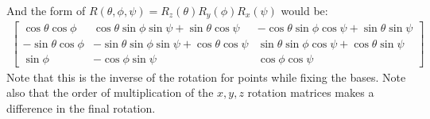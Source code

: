 And the form of $R(\theta,\phi,\psi) = R_z(\theta)R_y(\phi)R_x(\psi)$ would be:
\begin{align}
\begin{bmatrix}
\cos\theta\cos\phi & \cos\theta\sin\phi\sin\psi + \sin\theta\cos\psi & 
-\cos\theta\sin\phi\cos\psi + \sin\theta\sin\psi\\
%
-\sin\theta\cos\phi & -\sin\theta\sin\phi\sin\psi + \cos\theta\cos\psi &
\sin\theta\sin\phi\cos\psi + \cos\theta\sin\psi\\
%
\sin\phi & -\cos\phi\sin\psi & \cos\phi\cos\psi
\end{bmatrix}
\end{align}
Note that this is the inverse of the rotation for points while fixing the bases. 
Note also that the order of multiplication of the $x,y,z$ rotation matrices
makes a difference in the final rotation.
